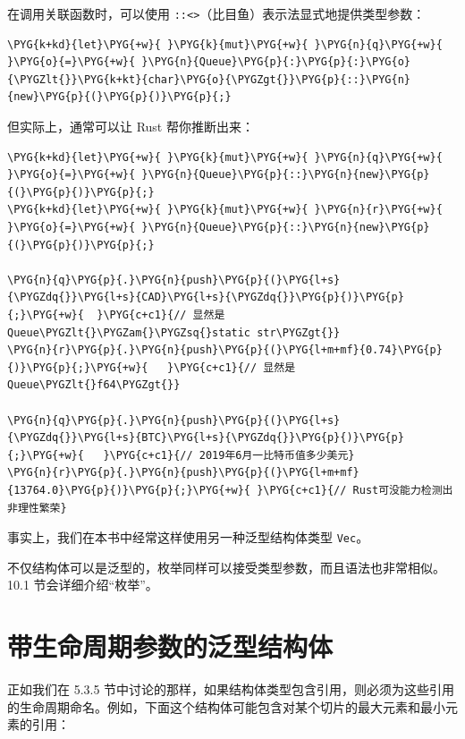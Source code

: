 在调用关联函数时，可以使用 \texttt{::<>}（比目鱼）表示法显式地提供类型参数：

\begin{Verbatim}[commandchars=\\\{\},breaklines=true,breakanywhere=true,fontsize=\codefont,xleftmargin=17bp]
\PYG{k+kd}{let}\PYG{+w}{ }\PYG{k}{mut}\PYG{+w}{ }\PYG{n}{q}\PYG{+w}{ }\PYG{o}{=}\PYG{+w}{ }\PYG{n}{Queue}\PYG{p}{:}\PYG{p}{:}\PYG{o}{\PYGZlt{}}\PYG{k+kt}{char}\PYG{o}{\PYGZgt{}}\PYG{p}{::}\PYG{n}{new}\PYG{p}{(}\PYG{p}{)}\PYG{p}{;}
\end{Verbatim}

但实际上，通常可以让 Rust 帮你推断出来：

\begin{Verbatim}[commandchars=\\\{\},breaklines=true,breakanywhere=true,fontsize=\codefont,xleftmargin=17bp]
\PYG{k+kd}{let}\PYG{+w}{ }\PYG{k}{mut}\PYG{+w}{ }\PYG{n}{q}\PYG{+w}{ }\PYG{o}{=}\PYG{+w}{ }\PYG{n}{Queue}\PYG{p}{::}\PYG{n}{new}\PYG{p}{(}\PYG{p}{)}\PYG{p}{;}
\PYG{k+kd}{let}\PYG{+w}{ }\PYG{k}{mut}\PYG{+w}{ }\PYG{n}{r}\PYG{+w}{ }\PYG{o}{=}\PYG{+w}{ }\PYG{n}{Queue}\PYG{p}{::}\PYG{n}{new}\PYG{p}{(}\PYG{p}{)}\PYG{p}{;}

\PYG{n}{q}\PYG{p}{.}\PYG{n}{push}\PYG{p}{(}\PYG{l+s}{\PYGZdq{}}\PYG{l+s}{CAD}\PYG{l+s}{\PYGZdq{}}\PYG{p}{)}\PYG{p}{;}\PYG{+w}{  }\PYG{c+c1}{// 显然是Queue\PYGZlt{}\PYGZam{}\PYGZsq{}static str\PYGZgt{}}
\PYG{n}{r}\PYG{p}{.}\PYG{n}{push}\PYG{p}{(}\PYG{l+m+mf}{0.74}\PYG{p}{)}\PYG{p}{;}\PYG{+w}{   }\PYG{c+c1}{// 显然是Queue\PYGZlt{}f64\PYGZgt{}}

\PYG{n}{q}\PYG{p}{.}\PYG{n}{push}\PYG{p}{(}\PYG{l+s}{\PYGZdq{}}\PYG{l+s}{BTC}\PYG{l+s}{\PYGZdq{}}\PYG{p}{)}\PYG{p}{;}\PYG{+w}{   }\PYG{c+c1}{// 2019年6月一比特币值多少美元}
\PYG{n}{r}\PYG{p}{.}\PYG{n}{push}\PYG{p}{(}\PYG{l+m+mf}{13764.0}\PYG{p}{)}\PYG{p}{;}\PYG{+w}{ }\PYG{c+c1}{// Rust可没能力检测出非理性繁荣}
\end{Verbatim}

事实上，我们在本书中经常这样使用另一种泛型结构体类型 \texttt{Vec}。

不仅结构体可以是泛型的，枚举同样可以接受类型参数，而且语法也非常相似。10.1 节会详细介绍“枚举”。

\section{带生命周期参数的泛型结构体}

正如我们在 5.3.5 节中讨论的那样，如果结构体类型包含引用，则必须为这些引用的生命周期命名。例如，下面这个结构体可能包含对某个切片的最大元素和最小元素的引用：

